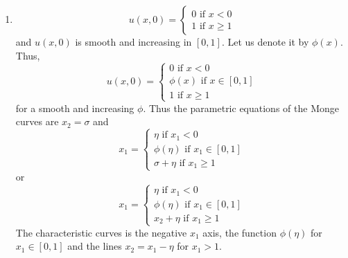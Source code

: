 \documentclass{article}
\theoremstyle{plain}
\numberwithin{thm}{section}
\theoremstyle{plain}
\numberwithin{prop}{section}
\theoremstyle{definition}
\numberwithin{defn}{section}
\theoremstyle{remark}
\numberwithin{equation}{section}
\begin{document}
\begin{enumerate}
\begin{enumerate}
\item \begin{equation}\label{s5e41}
u(x, 0) = \begin{cases}
0 \text{ if } x < 0 \\
1 \text{ if } x \ge 1
\end{cases}
\end{equation}
and $u(x, 0)$ is smooth and increasing in $[0, 1]$. Let us denote it by $\phi(x)$. Thus,
\begin{equation}\label{s5e42}
u(x, 0) = \begin{cases}
0 \text{ if } x < 0 \\
\phi(x) \text{ if } x \in [0, 1] \\
1 \text{ if } x \ge 1
\end{cases}
\end{equation}
for a smooth and increasing $\phi$. Thus the parametric equations of the Monge curves are $x_2 = 
\sigma$ and 
\begin{equation}\label{s5e43}
x_1 = \begin{cases}
\eta \text{ if } x_1 < 0 \\
\phi(\eta) \text{ if } x_1 \in [0, 1] \\
\sigma + \eta \text{ if } x_1 \ge 1
\end{cases}
\end{equation}
or
\begin{equation}\label{s5e44}
x_1 = \begin{cases}
\eta \text{ if } x_1 < 0 \\
\phi(\eta) \text{ if } x_1 \in [0, 1] \\
x_2 + \eta \text{ if } x_1 \ge 1
\end{cases}
\end{equation}
The characteristic curves is the negative $x_1$ axis, the function $\phi(\eta)$ for $x_1 \in [0, 1]$
and the lines $x_2 = x_1 - \eta$ for $x_1 > 1$.
\end{enumerate}
\end{enumerate}
\end{document}
